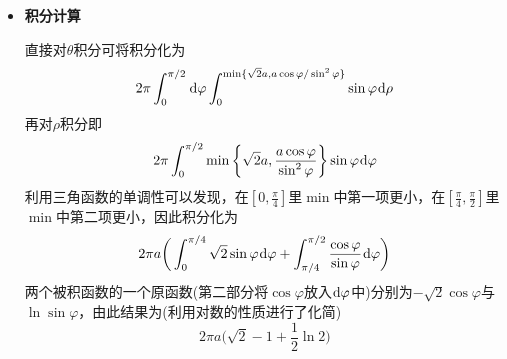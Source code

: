\documentclass[a4paper,UTF8,fontset=windows,AutoFakeBold]{ctexart}
\newcommand*{\dr}{\hspace{0.07em}\mathrm{d}}
\theoremstyle{ex}
\begin{document}
\begin{framed}
{\begin{itemize}
        由于$\rho$自然被$\varphi$约束，而区域与被积函数均和$\theta$无关，采取$\theta$、$\rho$、$\varphi$的积分顺序。此时，我们需要将集合描述成
        $$\alpha\le\varphi\le\beta,\quad \phi_1(\varphi)\le\rho\le\phi_2(\varphi),\quad\psi_1(\rho,\varphi)\le\theta\le\psi_2(\rho,\varphi)$$

        根据$\rho\ge0$的自然范围，存在合理的$\rho$至少需要$\cos\varphi\ge0$，结合球坐标自然范围可知第一个不等式为
        $$0\le\varphi\le\frac{\pi}{2}$$
        $\rho$最小一定可取到0，最大同时存在两个约束，由此可知$\varphi\ne0$时
        $$0\le\rho\le\min\bigg\{\sqrt2a,\frac{a\cos\varphi}{\sin^2\varphi}\bigg\}$$
        当$\varphi=0$时，分析可发现$a\cos\varphi\ge\rho\sin^2\varphi$恒成立，由此相当于认为$\min$中的第二项为无穷，取第一个约束$\sqrt2a$。

        最后，$\theta$的范围即为球坐标自然范围
        $$0\le\theta\le2\pi$$
        综合以上讨论可写出累次积分
        $$\int_0^{\pi/2}\dr\varphi\int_0^{\min\{\sqrt2a,a\cos\varphi/\sin^2\varphi\}}\dr\rho\int_0^{2\pi}\sin\varphi\dr\theta$$

        \item \textbf{积分计算}

        直接对$\theta$积分可将积分化为
        $$2\pi\int_0^{\pi/2}\dr\varphi\int_0^{\min\{\sqrt2a,a\cos\varphi/\sin^2\varphi\}}\sin\varphi\dr\rho$$
        再对$\rho$积分即
        $$2\pi\int_0^{\pi/2}\min\bigg\{\sqrt2a,\frac{a\cos\varphi}{\sin^2\varphi}\bigg\}\sin\varphi\dr\varphi$$
        利用三角函数的单调性可以发现，在$[0,\frac{\pi}{4}]$里$\min$中第一项更小，在$[\frac{\pi}{4},\frac{\pi}{2}]$里$\min$中第二项更小，因此积分化为
        $$2\pi a\bigg(\int_0^{\pi/4}\sqrt2\sin\varphi\dr\varphi+\int_{\pi/4}^{\pi/2}\frac{\cos\varphi}{\sin\varphi}\dr\varphi\bigg)$$
        两个被积函数的一个原函数(第二部分将$\cos\varphi$放入$\dr\varphi$中)分别为$-\sqrt2\cos\varphi$与$\ln\sin\varphi$，由此结果为(利用对数的性质进行了化简)
        $$2\pi a\bigg(\sqrt2-1+\frac{1}{2}\ln2\bigg)$$
    \end{itemize}
}
\end{framed}
\end{document}
